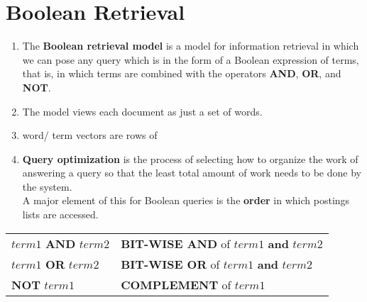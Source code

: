 \chapter{Boolean Retrieval \cite{ir-1}}\label{Boolean retrieval}

\begin{enumerate}
    \item The \textbf{Boolean retrieval model} is a model for information retrieval in which we can pose any query which is in the form of a Boolean expression of terms, that is, in which terms are combined with the operators \textbf{AND}, \textbf{OR}, and \textbf{NOT}.

    \item The model views each document as just a set of words.

    \item word/ term vectors are rows of 

    \item \textbf{Query optimization} is the process of selecting how to organize the work of answering a query so that the least total amount of work needs to be done by the system.\\
    A major element of this for Boolean queries is the \textbf{order} in which postings lists are accessed.

\end{enumerate}

\begin{table}[h]
    \centering
    \begin{tabular}{l l}
        $term1$ \textbf{AND} $term2$ & \textbf{BIT-WISE AND} of $term1$ \textbf{and} $term2$ \\
        $term1$ \textbf{OR} $term2$ & \textbf{BIT-WISE OR} of $term1$ \textbf{and} $term2$ \\
        \textbf{NOT} $term1$ & \textbf{COMPLEMENT} of $term1$
    \end{tabular}
\end{table}

